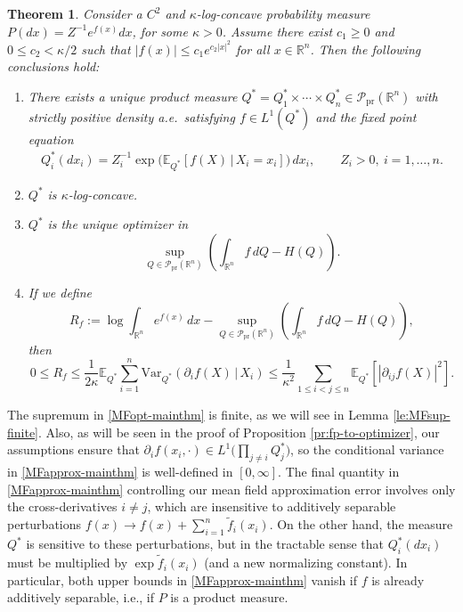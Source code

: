 \documentclass[11pt,reqno]{amsart}
\numberwithin{equation}{section}
\newtheorem{theorem}{Theorem}[section]
\theoremstyle{definition}
\def\E{{\mathbb E}}
\def\R{{\mathbb R}}
\def\P{{\mathcal P}}
\def\Var{{\mathrm{Var}}}
\def\Pprod{\P_{\mathrm{pr}}}
\begin{document}
\begin{theorem} \label{th:main-intro}
	Consider a $C^2$ and $\kappa$-log-concave probability measure $P(dx)=Z^{-1}e^{f(x)}dx$,  for some $ \kappa > 0 $. Assume there exist $ c_1 \ge 0 $ and $0 \le c_2  < \kappa/2$ such that $ |f(x)| \le  c_1 e^{c_2 |x|^2} $ for all $ x \in \R^n $. Then the following conclusions hold:
	\begin{enumerate}[(1)]
		\item \label{main.fp} There exists a unique product measure $Q^* = Q^*_1 \times \cdots \times Q^*_n \in \Pprod(\R^n)$  with strictly positive density a.e.\ satisfying  $f \in L^1(Q^*)$ and the fixed point equation
		\begin{align}
			Q^*_i(dx_i) = Z_i^{-1} \exp \big(\E_{Q^*}[f(X)\,|\,X_i=x_i]\big)\,dx_i, \qquad  Z_i > 0, \ i=1,\ldots,n.  \label{fixedpoint-mainthm}
		\end{align}
		\item $Q^*$ is $\kappa$-log-concave. \label{Q^*-log-concave}
		\item \label{main.unique}$Q^*$ is the unique optimizer in
		\begin{equation}
			\sup_{Q \in \Pprod(\R^n)} \left( \int_{\R^n} f\,dQ- H(Q)\right).  \label{MFopt-mainthm}
		\end{equation}
		\item \label{main.bound}If we define
		\begin{equation*}
			R_f  := \log \int_{\R^n}  e^{f(x)}\,dx -  \sup_{Q \in \Pprod(\R^n) } \left( \int_{\R^n} f\,dQ - H(Q)\right), %
		\end{equation*}
		then
		\begin{equation}
			0 \le R_f \le  \frac{1}{2\kappa} \E_{Q^*}\sum_{i=1}^n  \Var_{Q^*}(\partial_i f(X)\,|\,X_i)  \le \frac{1}{\kappa^2}\sum_{1\le i<j\le n} \E_{Q^*}[|\partial_{ij}f(X)|^2].  \label{MFapprox-mainthm}
		\end{equation}
	\end{enumerate}
\end{theorem}



The supremum in \eqref{MFopt-mainthm} is finite, as we will see in Lemma \ref{le:MFsup-finite}. Also, as will be seen in the proof of Proposition \ref{pr:fp-to-optimizer}, our assumptions ensure that $ \partial_if (x_i, \cdot) \in L^1\big(\prod_{j \neq i}Q^*_j\big)$, so the conditional variance in \eqref{MFapprox-mainthm} is well-defined in $ [0, \infty] $. The final quantity in \eqref{MFapprox-mainthm} controlling our mean field approximation error involves only the cross-derivatives $i \neq j$, which are insensitive to additively separable perturbations  $f(x) \to f(x) + \sum_{i=1}^n\tilde{f}_i(x_i)$. On the other hand, the measure $Q^*$ is sensitive to these perturbations, but in the tractable sense that $Q^*_i(dx_i)$ must be multiplied by $\exp \tilde{f}_i(x_i)$ (and a new normalizing constant). In particular,  both upper bounds in \eqref{MFapprox-mainthm} vanish if $f$ is already additively separable, i.e., if $P$ is a product measure.
\end{document}
